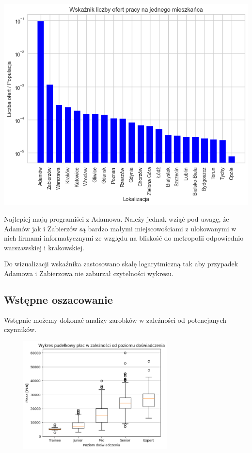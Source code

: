 \documentclass{article}
\begin{document}
\begin{center}
    \includegraphics[scale=0.5]{img/location_job_per_pop.png}
\end{center}

Najlepiej mają programiści z Adamowa. Należy jednak wziąć pod uwagę, że Adamów jak i Zabierzów
są bardzo małymi miejscowościami z ulokowanymi w nich firmami informatycznymi ze względu na
bliskość do metropolii odpowiednio warszawskiej i krakowskiej.

Do wizualizacji wskaźnika zastosowano skalę logarytmiczną tak
aby przypadek Adamowa i Zabierzowa nie zaburzał czytelności wykresu.

\subsection{Wstępne oszacowanie}

Wstępnie możemy dokonać analizy zarobków w zależności od potencjanych czynników.

\begin{figure}[!hbt]
    \centering
    \includegraphics[width=0.7\textwidth]{img/box_zarobki_exp.png}
\end{figure}
\end{document}
